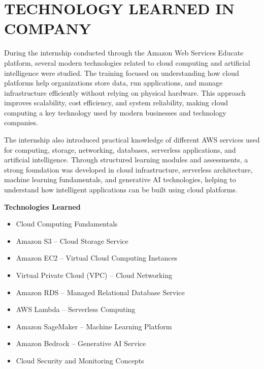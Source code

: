 \documentclass[12pt, a4paper, oneside]{report}
\begin{document}
\chapter{TECHNOLOGY LEARNED IN COMPANY}

During the internship conducted through the Amazon Web Services Educate platform, 
several modern technologies related to cloud computing and artificial intelligence 
were studied. The training focused on understanding how cloud platforms help 
organizations store data, run applications, and manage infrastructure efficiently without 
relying on physical hardware. This approach improves scalability, cost efficiency, and 
system reliability, making cloud computing a key technology used by modern 
businesses and technology companies.

The internship also introduced practical knowledge of different AWS services used for 
computing, storage, networking, databases, serverless applications, and artificial 
intelligence. Through structured learning modules and assessments, a strong foundation 
was developed in cloud infrastructure, serverless architecture, machine learning 
fundamentals, and generative AI technologies, helping to understand how intelligent 
applications can be built using cloud platforms.

\medskip
\noindent \textbf{Technologies Learned}

\begin{itemize}[leftmargin=1.5cm]
    \item Cloud Computing Fundamentals
    \item Amazon S3 -- Cloud Storage Service
    \item Amazon EC2 -- Virtual Cloud Computing Instances
    \item Virtual Private Cloud (VPC) -- Cloud Networking
    \item Amazon RDS -- Managed Relational Database Service
    \item AWS Lambda -- Serverless Computing
    \item Amazon SageMaker -- Machine Learning Platform
    \item Amazon Bedrock -- Generative AI Service
    \item Cloud Security and Monitoring Concepts
    
\end{itemize}
\end{document}
